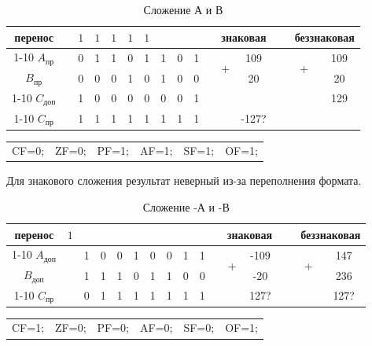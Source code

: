 \begin{table}[H]
    \centering
    \caption{Сложение А и В}
    \begin{tabular}{c|cc|cccccccp{1cm}ccp{0.5cm}cc}
		\small перенос & & $1$ & $1$ & $1$ & $1$ & $1$ & & & & & \multicolumn{2}{c}{знаковая} & \  & \multicolumn{2}{c}{беззнаковая}  \\
		\cline{1-10} \cline{12-13} \cline{15-16}
		$A_{\text{пр}}$ & & 0 & 1 & 1 & 0 & 1 & 1 & 0 & 1 & & \multirow{2}{*}{+} & 109 & \  & \multirow{2}{*}{+} & 109   \\
		$B_{\text{пр}}$ & & 0 & 0 & 0 & 1 & 0 & 1 & 0 & 0 & & & 20 & \  &  & 20 \\
		\cline{1-10} \cline{12-13} \cline{15-16}
		$C_{\text{доп}}$ & & 1 & 0 & 0 & 0 & 0 & 0 & 0 & 1 & & & & \  &  & 129 \\
		\cline{1-10} \cline{12-13} \cline{15-16}
		$C_{\text{пр}}$ & & 1 & 1 & 1 & 1 & 1 & 1 & 1 & 1 & & & -127? & \  &  & \\
    \end{tabular}
\end{table}

\begin{table}[H]
    \centering
    \begin{tabular}{cccccc}
        CF=0; & ZF=0; & PF=1; & AF=1; & SF=1; & OF=1;
    \end{tabular}
\end{table}

Для знакового сложения результат неверный из-за переполнения формата.

\begin{table}[H]
    \centering
    \caption{Сложение -А и -В}
    \begin{tabular}{c|cc|cccccccp{1cm}ccp{0.5cm}cc}
		\small перенос & $1$ &  &  &  &  &  & & & & & \multicolumn{2}{c}{знаковая} & \  & \multicolumn{2}{c}{беззнаковая}  \\
		\cline{1-10} \cline{12-13} \cline{15-16}
		$A_{\text{доп}}$ & & 1 & 0 & 0 & 1 & 0 & 0 & 1 & 1 & & \multirow{2}{*}{+} & -109 & \  & \multirow{2}{*}{+} & 147\\
		$B_{\text{доп}}$ & & 1 & 1 & 1 & 0 & 1 & 1 & 0 & 0 & & & -20 & \  &  & 236 \\
		\cline{1-10} \cline{12-13} \cline{15-16}
		$C_{\text{пр}}$ & & 0 & 1 & 1 & 1 & 1 & 1 & 1 & 1 & & & 127? & \  &  & 127?\\
    \end{tabular}
\end{table}

\begin{table}[H]
    \centering
    \begin{tabular}{cccccc}
        CF=1; & ZF=0; & PF=0; & AF=0; & SF=0; & OF=1;
    \end{tabular}
\end{table}

